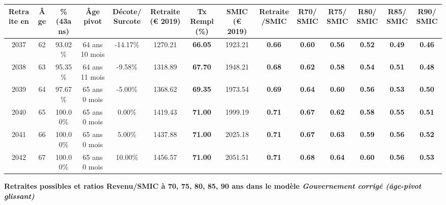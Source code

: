 \begin{adjustbox}{max width=\textwidth} 
\begin{tabular}[htb]{|c|c||c|c|c||c|c||c|c||c|c|c|c|c|} 
\hline 
 Retraite en &  Âge &  \%(43ans) &  Âge pivot &  Décote/Surcote &  Retraite (\euro{} 2019) &  Tx Rempl(\%) &  SMIC (\euro{} 2019) &  Retraite/SMIC &  R70/SMIC &  R75/SMIC &  R80/SMIC &  R85/SMIC &  R90/SMIC \\ 
\hline \hline 
 2037 &  62 &  93.02\% &  64 ans 10 mois &  -14.17\% &  1270.21 &  {\bf 66.05} &  1923.21 &  {\bf {\color{red} 0.66}} &  {\bf {\color{red} 0.60}} &  {\bf {\color{red} 0.56}} &  {\bf {\color{red} 0.52}} &  {\bf {\color{red} 0.49}} &  {\bf {\color{red} 0.46}} \\ 
\hline 
 2038 &  63 &  95.35\% &  64 ans 11 mois &  -9.58\% &  1318.89 &  {\bf 67.70} &  1948.21 &  {\bf {\color{red} 0.68}} &  {\bf {\color{red} 0.62}} &  {\bf {\color{red} 0.58}} &  {\bf {\color{red} 0.54}} &  {\bf {\color{red} 0.51}} &  {\bf {\color{red} 0.48}} \\ 
\hline 
 2039 &  64 &  97.67\% &  65 ans 0 mois &  -5.00\% &  1368.62 &  {\bf 69.35} &  1973.54 &  {\bf {\color{red} 0.69}} &  {\bf {\color{red} 0.64}} &  {\bf {\color{red} 0.60}} &  {\bf {\color{red} 0.56}} &  {\bf {\color{red} 0.53}} &  {\bf {\color{red} 0.50}} \\ 
\hline 
 2040 &  65 &  100.00\% &  65 ans 0 mois &  0.00\% &  1419.43 &  {\bf 71.00} &  1999.19 &  {\bf {\color{red} 0.71}} &  {\bf {\color{red} 0.67}} &  {\bf {\color{red} 0.62}} &  {\bf {\color{red} 0.58}} &  {\bf {\color{red} 0.55}} &  {\bf {\color{red} 0.51}} \\ 
\hline 
 2041 &  66 &  100.00\% &  65 ans 0 mois &  5.00\% &  1437.88 &  {\bf 71.00} &  2025.18 &  {\bf {\color{red} 0.71}} &  {\bf {\color{red} 0.67}} &  {\bf {\color{red} 0.63}} &  {\bf {\color{red} 0.59}} &  {\bf {\color{red} 0.56}} &  {\bf {\color{red} 0.52}} \\ 
\hline 
 2042 &  67 &  100.00\% &  65 ans 0 mois &  10.00\% &  1456.57 &  {\bf 71.00} &  2051.51 &  {\bf {\color{red} 0.71}} &  {\bf {\color{red} 0.68}} &  {\bf {\color{red} 0.64}} &  {\bf {\color{red} 0.60}} &  {\bf {\color{red} 0.56}} &  {\bf {\color{red} 0.53}} \\ 
\hline 
\hline 
\end{tabular} 
\end{adjustbox} 
 
 \vspace{0.1cm} 
{\bf \noindent Retraites possibles et ratios Revenu/SMIC à 70, 75, 80, 85, 90 ans dans le modèle \emph{Gouvernement corrigé (âge-pivot glissant)}}  
 
